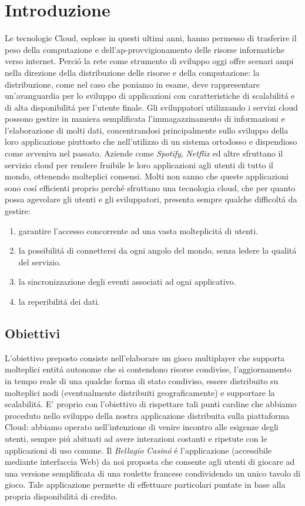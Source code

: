 \documentclass{sig-alternate-05-2015}
\begin{document}
\section{Introduzione}


Le tecnologie Cloud, esplose in questi ultimi anni, hanno permesso di trasferire il peso della computazione e dell'ap-provvigionamento delle risorse informatiche verso internet. Perci\'o la rete come strumento di sviluppo oggi offre scenari ampi nella direzione della distribuzione delle risorse e della computazione: la distribuzione, come nel caso che poniamo in esame, deve rappresentare un'avanguardia per lo sviluppo di applicazioni con caratteristiche di scalabilit\'a e di alta disponibilit\'a per l'utente finale. 
Gli sviluppatori utilizzando i servizi cloud possono gestire in maniera semplificata l'immagazzinamento di informazioni e l'elaborazione di molti dati, concentrandosi principalmente sullo sviluppo della loro applicazione piuttosto che nell'utilizzo di un sistema ortodosso e dispendioso come avveniva nel passato.
Aziende come \textit{Spotify}, \textit{Netflix} ed altre sfruttano il servizio cloud per rendere fruibile le loro applicazioni agli utenti di tutto il mondo, ottenendo molteplici consensi. Molti non sanno che queste applicazioni sono cos\'i efficienti proprio perch\'e sfruttano una tecnologia cloud, che per quanto possa agevolare gli utenti e gli sviluppatori, presenta sempre qualche difficolt\'a da gestire:
\begin{enumerate}
\item garantire l'accesso concorrente ad una vasta molteplicit\'a di utenti.
\item la possibilit\'a di connettersi da ogni angolo del mondo, senza ledere la qualit\'a del servizio.
\item la sincronizzazione degli eventi associati ad ogni applicativo.
\item la reperibilit\'a dei dati.
\end{enumerate}

\subsection{Obiettivi}


L'obiettivo preposto consiste nell'elaborare un gioco multiplayer che supporta molteplici entit\'a autonome che si contendono risorse condivise, l'aggiornamento in tempo reale di una qualche forma di stato condiviso, essere distribuito su molteplici nodi (eventualmente distribuiti geograficamente) e supportare la scalabilit\'a.
E' proprio con l'obiettivo di rispettare tali punti cardine che abbiamo proceduto nello sviluppo della nostra applicazione distribuita sulla piattaforma Cloud: abbiamo operato nell'intenzione di venire incontro alle esigenze degli utenti, sempre pi\'u abituati ad avere interazioni costanti e ripetute con le applicazioni di uso comune.
Il \textit{Bellagio Casin\'o} \'e l'applicazione (accessibile mediante interfaccia Web) da noi proposta che consente agli utenti di giocare ad una versione semplificata di una roulette francese condividendo un unico tavolo di gioco.
Tale applicazione permette di effettuare particolari puntate in base alla propria disponibilit\'a di credito.
\end{document}
